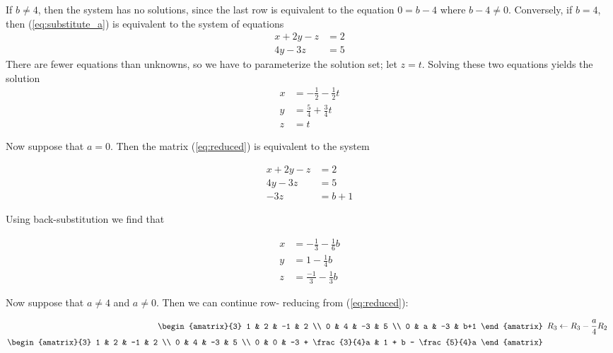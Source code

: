 \documentclass{article}
\begin{document}
If $b \neq 4$, then the system has no solutions, since the last row is
equivalent to the equation $0 = b-4$ where $b-4 \neq 0$.  Conversely, if
$b = 4$, then (\ref{eq:substitute_a}) is equivalent to the system of
equations
\begin{align*}
 x + 2y -z &= 2 \\
 4y - 3z &= 5
\end{align*}
There are fewer equations than unknowns, so we have to parameterize the
solution set; let $z = t$.  Solving these two equations yields the solution
\begin{equation}\begin{aligned}
 x &= -\frac{1}{2} - \frac{1}{2}t \\
 y &= \frac{5}{4} + \frac{3}{4}t \\
 z &= t
\end{aligned}\label{q4:inf}\end{equation}

Now suppose that $a = 0$.  Then the matrix (\ref{eq:reduced}) is equivalent
to the system

\begin{align*}
 x + 2y -z &= 2 \\
 4y -3z &= 5 \\
 -3z &= b+1
\end{align*}

Using back-substitution we find that

\begin{align*}
 x &= -\frac{1}{3} - \frac{1}{6}b \\
 y &= 1 - \frac{1}{4}b \\
 z &= \frac{-1}{3} - \frac{1}{3}b
\end{align*}

Now suppose that $a \neq 4$ and $a \neq 0$.  Then we can continue row-
reducing from (\ref{eq:reduced}):

\begin{align}
 \begin{amatrix}{3}
  1 & 2 & -1 &   2 \\
  0 & 4 & -3 &   5 \\
  0 & a & -3 & b+1
 \end{amatrix} &
 \begin{array}{l}
  R_3 \leftarrow R_3 - \dfrac{a}{4}R_2
 \end{array} 
 \nonumber \\
 \begin{amatrix}{3}
  1 & 2 & -1 & 2 \\
  0 & 4 & -3 & 5 \\
  0 & 0 & -3 + \frac{3}{4}a & 1 + b - \frac{5}{4}a
 \end{amatrix}
 \nonumber
\end{align}
\end{document}
